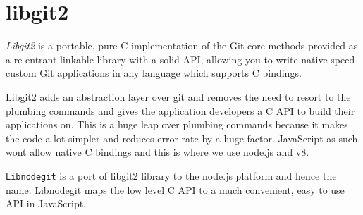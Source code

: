 \section{libgit2}

\textit{Libgit2}\cite{libgit2} is a portable, pure C implementation of the Git
core methods provided as a re-entrant linkable library with a solid API,
allowing you to write native speed custom Git applications in any language which
supports C bindings.

Libgit2 adds an abstraction layer over git and removes the need to resort to the
plumbing commands and gives the application developers a C API to build their
applications on. This is a huge leap over plumbing commands because it makes the
code a lot simpler and reduces error rate by a huge factor. JavaScript as such
wont allow native C bindings and this is where we use node.js and v8.

\texttt{Libnodegit} is a port of libgit2 library to the node.js platform and
hence the name. Libnodegit maps the low level C API to a much convenient, easy
to use API in JavaScript.

